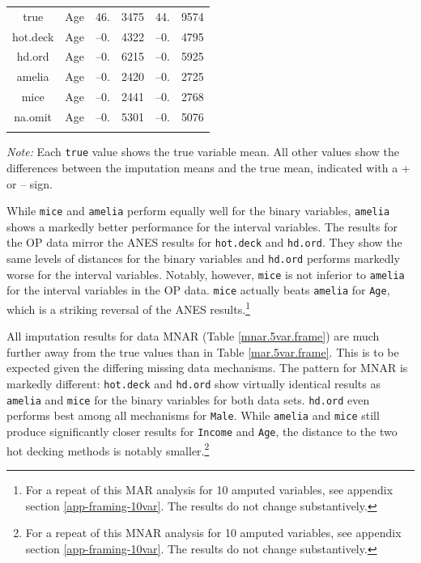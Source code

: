 \documentclass[12pt,econ]{sources/authesis}
\begin{document}
\begin{table}[H]
\begin{threeparttable}
\begin{tabular}{ccr@{}lr@{}l}
 true & Age & 46.&3475 & 44.&9574 \\ 
 hot.deck & Age & --0.&4322 & --0.&4795 \\
 hd.ord & Age & --0.&6215 & --0.&5925 \\
 amelia & Age & --0.&2420 & --0.&2725 \\ 
 mice & Age & --0.&2441 & --0.&2768 \\ 
 na.omit & Age & --0.&5301 & --0.&5076 \\
 \hline \\[-1.8ex] 
\end{tabular} 
\begin{tablenotes}
\footnotesize{\textit{Note:} Each \texttt{true} value shows the true variable mean. All other values show the differences between the imputation means and the true mean, indicated with a + or -- sign.}
\end{tablenotes}
\end{threeparttable}
\end{table}
\dsp

While \texttt{mice} and \texttt{amelia} perform equally well for the binary variables, \texttt{amelia} shows a markedly better performance for the interval variables. The results for the OP data mirror the ANES results for \texttt{hot.deck} and \texttt{hd.ord}. They show the same levels of distances for the binary variables and \texttt{hd.ord} performs markedly worse for the interval variables. Notably, however, \texttt{mice} is not inferior to \texttt{amelia} for the interval variables in the OP data. \texttt{mice} actually beats \texttt{amelia} for \texttt{Age}, which is a striking reversal of the ANES results.\footnote{For a repeat of this MAR analysis for 10 amputed variables, see appendix section \ref{app-framing-10var}. The results do not change substantively.}

All imputation results for data MNAR (Table \ref{mnar.5var.frame}) are much further away from the true values than in Table \ref{mar.5var.frame}. This is to be expected given the differing missing data mechanisms. The pattern for MNAR is markedly different: \texttt{hot.deck} and \texttt{hd.ord} show virtually identical results as \texttt{amelia} and \texttt{mice} for the binary variables for both data sets. \texttt{hd.ord} even performs best among all mechanisms for \texttt{Male}. While \texttt{amelia} and \texttt{mice} still produce significantly closer results for \texttt{Income} and \texttt{Age}, the distance to the two hot decking methods is notably smaller.\footnote{For a repeat of this MNAR analysis for 10 amputed variables, see appendix section \ref{app-framing-10var}. The results do not change substantively.}
\end{document}

